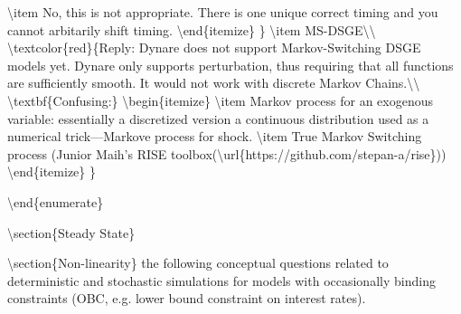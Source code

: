 \documentclass[10pt,math=newtx,citestyle=gb7714-2015,bibstyle=gb7714-2015]{elegantbook}
\begin{document}
	\textbackslash{}item No, this is not appropriate. There is one unique correct timing and you cannot arbitarily shift timing.
	\textbackslash{}end\{itemize\}
	\}
	\textbackslash{}item MS-DSGE\textbackslash{}\textbackslash{}
	\textbackslash{}textcolor\{red\}\{Reply: Dynare does not support Markov-Switching DSGE models yet. Dynare only supports perturbation, thus requiring that all functions are sufficiently smooth. It would not work with discrete Markov Chains.\textbackslash{}\textbackslash{}
	\textbackslash{}textbf\{Confusing:\}
	\textbackslash{}begin\{itemize\}
	\textbackslash{}item Markov process for an exogenous variable: essentially a discretized version a continuous distribution used as a numerical trick---Markove process for shock.
	\textbackslash{}item True Markov Switching process (Junior Maih's RISE toolbox(\textbackslash{}url\{https://github.com/stepan-a/rise\}))
	\textbackslash{}end\{itemize\}
	\}
	
	
	\textbackslash{}end\{enumerate\}
	
	\textbackslash{}section\{Steady State\}
	
	\textbackslash{}section\{Non-linearity\}
	the following conceptual questions related to deterministic and stochastic simulations for models with occasionally binding constraints (OBC, e.g. lower bound constraint on interest rates).
	
\end{document}
